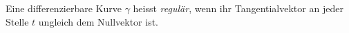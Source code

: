 \begin{definition}
    Eine differenzierbare Kurve $\gamma$ heisst \emph{regulär}, wenn ihr Tangentialvektor an jeder Stelle $t$ ungleich dem Nullvektor ist.
\end{definition}
